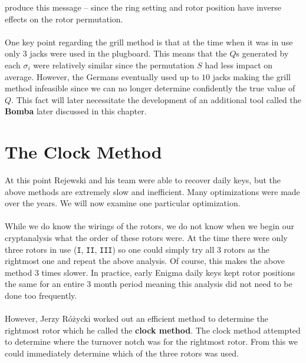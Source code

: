 produce this message -- since the ring setting and rotor position
have inverse effects on the rotor permutation.
\\\\One key point regarding the grill method is that at the time when
it was in use only $3$ jacks were used in the plugboard. This means
that the $Q$s generated by each $\sigma_i$ were relatively similar
since the permutation $S$ had less impact on average. However, the
Germans eventually used up to $10$ jacks making the grill method
infeasible since we can no longer determine confidently the true
value of $Q$. This fact will later necessitate the development of an
additional tool called the {\bf{Bomba}} later discussed in this chapter.

\section{The Clock Method}

At this point Rejewski and his team were able to recover daily keys,
but the above methods are extremely slow and inefficient. Many
optimizations were made over the years. We will now examine one
particular optimization.
\\\\While we do know the wirings of the rotors, we do not know when
we begin our cryptanalysis what the order of these rotors were. At
the time there were only three rotors in use (\texttt{I},
\texttt{II}, \texttt{III}) so one could simply try all 3 rotors as
the rightmost one and repeat the above analysis. Of course, this
makes the above method 3 times slower. In practice, early Enigma
daily keys kept rotor positions the same for an entire 3 month period
meaning this analysis did not need to be done too frequently.
\\\\However, Jerzy Różycki worked out an efficient method to
determine the rightmost rotor which he called the {\bf{clock
			method}}. The clock method attempted to determine where the turnover
notch was for the rightmost rotor. From this we could immediately
determine which of the three rotors was used.

